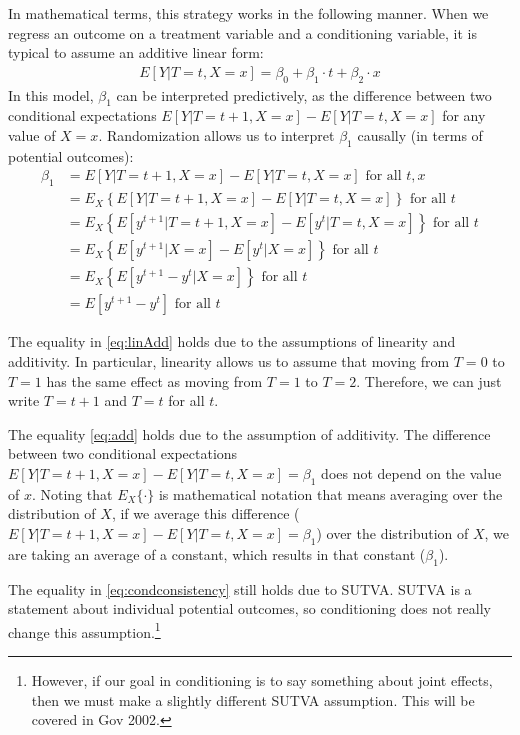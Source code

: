 \documentclass{article}
\begin{document}
In mathematical terms, this strategy works in the following manner. When we regress an outcome on a treatment variable and a conditioning variable, it is typical to assume an additive linear form:
\begin{align*}
E[Y|T=t,X=x] = \beta_0 + \beta_1 \cdot t + \beta_2 \cdot x
\end{align*}
In this model, $\beta_1$ can be interpreted predictively, as the difference between two conditional expectations $E[Y|T=t+1,X=x]-E[Y|T=t,X=x]$ for any value of $X=x$. Randomization allows us to interpret $\beta_1$ causally (in terms of potential outcomes): 
\begin{align}
\beta_1 &= E[Y|T=t+1,X=x]-E[Y|T=t,X=x] \text{ for all } t,x \label{eq:linAdd} \\
&= E_X\left\{E[Y|T=t+1,X=x]-E[Y|T=t,X=x]\right\} \text{ for all } t \label{eq:add} \\
&= E_X\left\{E[y^{t+1}|T=t+1,X=x]-E[y^{t}|T=t,X=x]\right\} \text{ for all } t \label{eq:condconsistency}\\
&= E_X\left\{E[y^{t+1}|X=x]-E[y^{t}|X=x]\right\} \text{ for all } t \label{eq:condignore}\\
&= E_X\left\{E[y^{t+1}-y^{t}|X=x]\right\} \text{ for all } t \label{eq:condprop}\\
&= E[y^{t+1}-y^{t}]  \text{ for all } t \label{eq:totalexp}
\end{align}

The equality in \eqref{eq:linAdd} holds due to the assumptions of linearity and additivity. In particular, linearity allows us to assume that moving from $T=0$ to $T=1$ has the same effect as moving from $T=1$ to $T=2$. Therefore, we can just write $T=t+1$ and $T=t$ for all $t$. 

The equality \eqref{eq:add} holds due to the assumption of additivity. The difference between two conditional expectations $E[Y|T=t+1,X=x]-E[Y|T=t,X=x] = \beta_1$ does not depend on the value of $x$. Noting that $E_X\{ \cdot \}$ is mathematical notation that means averaging over the distribution of $X$, if we average this difference ($E[Y|T=t+1,X=x]-E[Y|T=t,X=x]=\beta_1$) over the distribution of $X$, we are taking an average of a constant, which results in that constant ($\beta_1$). 

The equality in \eqref{eq:condconsistency} still holds due to SUTVA. SUTVA is a statement about individual potential outcomes, so conditioning does not really change this assumption.\footnote{However, if our goal in conditioning is to say something about joint effects, then we must make a slightly different SUTVA assumption. This will be covered in Gov 2002.} 
\end{document}
